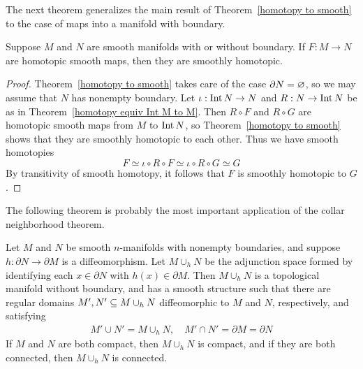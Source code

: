 The next theorem generalizes the main result of Theorem~\ref{homotopy to smooth} to the case of maps into a manifold with boundary.
\begin{theorem}\label{homotopy smooth boundary}
Suppose $M$ and $N$ are smooth manifolds with or without boundary. If $F:M\to N$ are homotopic smooth maps, then they are smoothly homotopic.
\end{theorem}
\begin{proof}
Theorem~\ref{homotopy to smooth} takes care of the case $\partial N=\varnothing$, so we may assume that $N$ has nonempty boundary. Let $\iota:\mathrm{Int}\, N\to N$ and $R:N\to\mathrm{Int}\, N$ be as in Theorem~\ref{homotopy equiv Int M to M}. Then $R\circ F$ and $R\circ G$ are homotopic smooth maps from $M$ to $\mathrm{Int}\, N$, so Theorem~\ref{homotopy to smooth} shows that they are smoothly homotopic to each other. Thus we have smooth homotopies
\[F\simeq\iota\circ R\circ F\simeq\iota\circ R\circ G\simeq G\]
By transitivity of smooth homotopy, it follows that $F$ is smoothly homotopic to $G$.
\end{proof}
The following theorem is probably the most important application of the collar
neighborhood theorem.
\begin{theorem}\label{attach mani}
Let $M$ and $N$ be smooth $n$-manifolds with nonempty boundaries, and suppose $h:\partial N\to\partial M$ is a diffeomorphism. Let $M\cup_hN$ be the adjunction space formed by identifying each $x\in\partial N$ with $h(x)\in\partial M$. Then $M\cup_hN$ is a topological manifold without boundary, and has a smooth structure such that there are regular domains $M',N'\subseteq M\cup_hN$ diffeomorphic to $M$ and $N$, respectively, and satisfying 
\begin{align}\label{attach mani-1}
M'\cup N'=M\cup_hN,\quad M'\cap N'=\partial M=\partial N
\end{align}
If $M$ and $N$ are both compact, then $M\cup_hN$ is compact, and if they are both
connected, then $M\cup_hN$ is connected.
\end{theorem}
